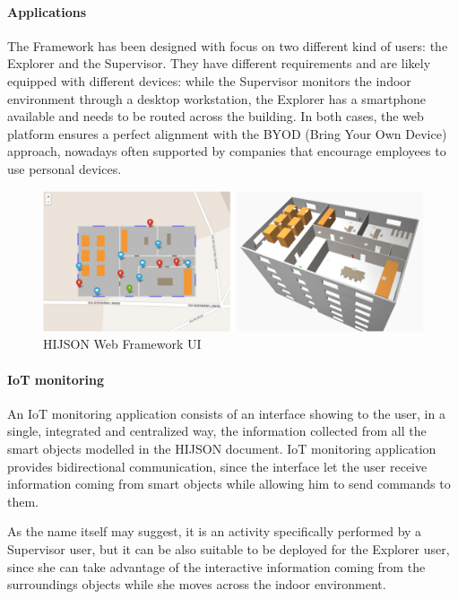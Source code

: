 \documentclass{sig-alternate}
\begin{document}
\paragraph{Applications}

The Framework has been designed with focus on two different kind of users: the
Explorer and the Supervisor. They have different requirements and are likely
equipped with different devices: while the Supervisor monitors the indoor
environment through a desktop workstation, the Explorer has a smartphone
available and needs to be routed across the building. In both cases, the web
platform ensures a perfect alignment with the BYOD (Bring Your Own Device)
approach, nowadays often supported by companies that encourage employees to
use personal devices.


\begin{figure}[htb]
\centering
\includegraphics[width=\linewidth]{images/2D-3D}
\caption{HIJSON Web Framework UI}
\label{fig:web-framework-ui}
\end{figure}

\paragraph{IoT monitoring}

An IoT monitoring application consists of an interface showing to the user, in
a single, integrated and centralized way, the information collected from all
the smart objects modelled in the HIJSON document. IoT monitoring application
provides bidirectional communication, since the interface let the user receive
information coming from smart objects while allowing him to send commands to
them.

As the name itself may suggest, it is an activity specifically performed by a
Supervisor user, but it can be also suitable to be deployed for the Explorer
user, since she can take advantage of the interactive information coming from
the surroundings objects while she moves across the indoor environment.
\end{document}
